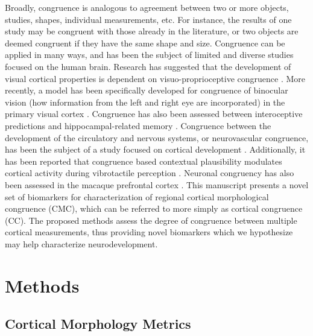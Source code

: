 \documentclass{article}
\begin{document}
Broadly, congruence is analogous to agreement between two or more
objects, studies, shapes, individual measurements, etc. For instance, the
results of one study may be congruent with those already in the literature,
or two objects are deemed congruent if they have the same shape and size.
Congruence can be applied in many ways, and has been the subject of limited
and diverse studies focused on the human brain. Research has suggested that
the development of visual cortical properties is dependent on
visuo-proprioceptive congruence \citep{buisseretChapter22Development1993}.
More recently, a model has been specifically developed for congruence of
binocular vision (how information from the left and right eye are
incorporated) in the primary visual cortex
\citep{somaratnaModelDevelopmentBinocular2022}. Congruence has also been
assessed between interoceptive predictions and hippocampal-related memory
\citep{edwards-duricCongruenceInteroceptivePredictions2020}. Congruence
between the development of the circulatory and nervous systems, or
neurovascular congruence, has been the subject of a study focused on cortical
development \citep{stubbsNeurovascularCongruenceCerebral2009}. Additionally,
it has been reported that congruence based contextual plausibility modulates
cortical activity during vibrotactile perception
\citep{kangCongruencebasedContextualPlausibility2022}. Neuronal congruency
has also been assessed in the macaque prefrontal cortex
\citep{yaoNeuronalCongruencyEffects2022}. This manuscript presents a novel
set of biomarkers for characterization of regional cortical morphological
congruence (CMC), which can be referred to more simply as cortical congruence
(CC). The proposed methods assess the degree of congruence between multiple
cortical measurements, thus providing novel biomarkers which we hypothesize
may help characterize neurodevelopment.

\section{Methods}
\label{sec:methods}

\subsection{Cortical Morphology Metrics}

\end{document}
